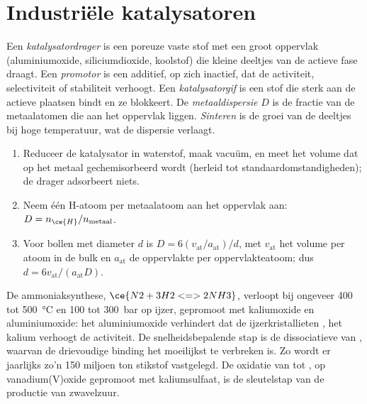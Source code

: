 \section{Industriële katalysatoren}

\begin{definition}\label{def:b3:surfaces-catalysis:catalyst-design}
Een \emph{katalysatordrager} is een poreuze vaste
stof met een groot oppervlak (aluminiumoxide, siliciumdioxide, koolstof)
die kleine deeltjes van de actieve fase draagt. Een
\emph{promotor} is een additief, op zich inactief, dat de
activiteit, selectiviteit of stabiliteit verhoogt. Een
\emph{katalysatorgif}
is een stof die sterk aan de actieve plaatsen bindt en ze blokkeert.
De \emph{metaaldispersie} $D$ is de fractie van de
metaalatomen die aan het oppervlak liggen. \emph{Sinteren}
is de groei van de deeltjes bij hoge temperatuur, wat de dispersie
verlaagt.
\end{definition}

\begin{method}\label{met:b3:surfaces-catalysis:dispersion}
\begin{enumerate}
  \item Reduceer de katalysator in waterstof, maak vacuüm, en meet het
        volume  dat op het metaal gechemisorbeerd wordt (herleid tot
        standaardomstandigheden); de drager adsorbeert niets.
  \item Neem één H-atoom per metaalatoom aan het oppervlak aan: $D = n_{\ce{H}}/n_{\text{metaal}}$.
  \item Voor bollen met diameter $d$ is $D = 6(v_{\mathrm{at}}/a_{\mathrm{at}})/d$, met $v_{\mathrm{at}}$ het volume per atoom in de
        bulk en $a_{\mathrm{at}}$ de oppervlakte per oppervlakteatoom; dus $d = 6v_{\mathrm{at}}/(a_{\mathrm{at}}D)$.
\end{enumerate}
\end{method}

De ammoniaksynthese, $\ce{N2 + 3 H2 <=> 2 NH3}$, verloopt bij ongeveer 400 tot
\qty{500}{\celsius} en 100 tot \qty{300}{bar} op ijzer, gepromoot met
kaliumoxide en aluminiumoxide: het aluminiumoxide verhindert dat de
ijzerkristallieten , het kalium verhoogt de activiteit. De
snelheidsbepalende stap is de dissociatieve  van ,
waarvan de drievoudige binding het moeilijkst te verbreken is. Zo wordt
er jaarlijks zo'n 150 miljoen ton stikstof vastgelegd.
De oxidatie van  tot , op vanadium(V)oxide gepromoot met
kaliumsulfaat, is de sleutelstap van de productie van zwavelzuur.

